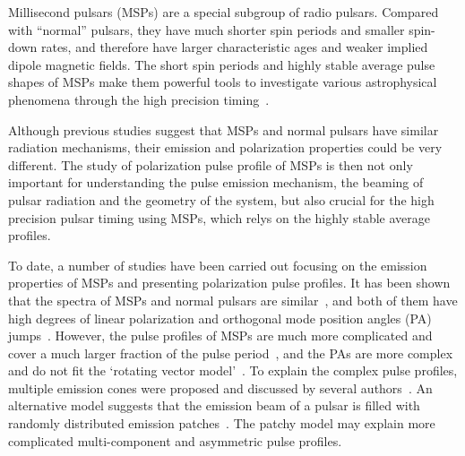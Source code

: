 \documentclass[useAMS,usenatbib]{mn2e}
\begin{document}
Millisecond pulsars (MSPs) are a special subgroup of radio pulsars. 
%
Compared with ``normal'' pulsars, they have much shorter spin periods 
and smaller spin-down rates, and therefore have larger characteristic 
ages and weaker implied dipole magnetic fields.
%
The short spin periods and highly stable average pulse shapes of MSPs 
make them powerful tools to investigate various astrophysical phenomena 
through the high precision timing~\citep[e.g.,][]{Manchester08}.
%

Although previous studies suggest that MSPs and normal pulsars have 
similar radiation mechanisms, their emission and polarization properties 
could be very different.
%
The study of polarization pulse profile of MSPs is then not only important 
for understanding the pulse emission mechanism, the beaming of pulsar 
radiation and the geometry of the system, but also crucial for the 
high precision pulsar timing using MSPs, which relys on the highly stable 
average profiles.
%

To date, a number of studies have been carried out focusing on the emission 
properties of MSPs and presenting polarization pulse profiles.
%
It has been shown that the spectra of MSPs and normal pulsars are similar~\citep{Toscano98,Kramer98,Kramer99}, 
and both of them have high degrees of linear polarization and orthogonal mode 
position angles (PA) jumps~\citep[see e.g.,][]{Thorsett90,Navarro97,Stairs99,Manchester04,Ord04}.
%
However, the pulse profiles of MSPs are much more complicated and cover a much 
larger fraction of the pulse period~\citep{Yan11}, and the PAs are more complex 
and do not fit the `rotating vector model'~\citep[RVM,][]{Radhakrishnan69}.
%
To explain the complex pulse profiles, multiple emission cones were proposed 
and discussed by several authors~\citep{Rankin93,Kramer94,Gupta03}. An alternative 
model suggests that the emission beam of a pulsar is filled with randomly 
distributed emission patches~\citep{Lyne88,Manchester95_2,Han01}. The patchy 
model may explain more complicated multi-component and asymmetric pulse profiles.
%
\end{document}
